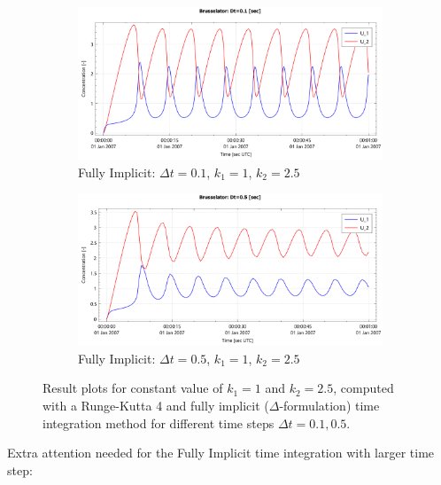 \documentclass{mooiman_memo}
\newcommand{\Dt}{\Delta t}
\begin{document}
\begin{figure}[H]\ContinuedFloat
    \begin{subfigure}{0.49\textwidth}
    \includegraphics[width=\textwidth]{figures/brusselator_imp_dt=0d10.pdf}
    \caption{Fully Implicit: $\Dt=0.1$, $k_1=1$, $k_2=2.5$}
    \end{subfigure}
    \hfill
    \begin{subfigure}{0.49\textwidth}
        \includegraphics[width=\textwidth]{figures/brusselator_imp_dt=0d50.pdf}
        \caption{Fully Implicit: $\Dt=0.5$, $k_1=1$, $k_2=2.5$}
    \end{subfigure}
    \caption{Result plots for constant value of $k_1 = 1$ and $k_2 =2.5$, computed with a Runge-Kutta 4 and fully implicit ($\Delta$-formulation) time integration method for different time steps $\Dt = 0.1, 0.5$.
    }
\end{figure}
Extra attention needed for the Fully Implicit time integration with larger time step:
\end{document}
